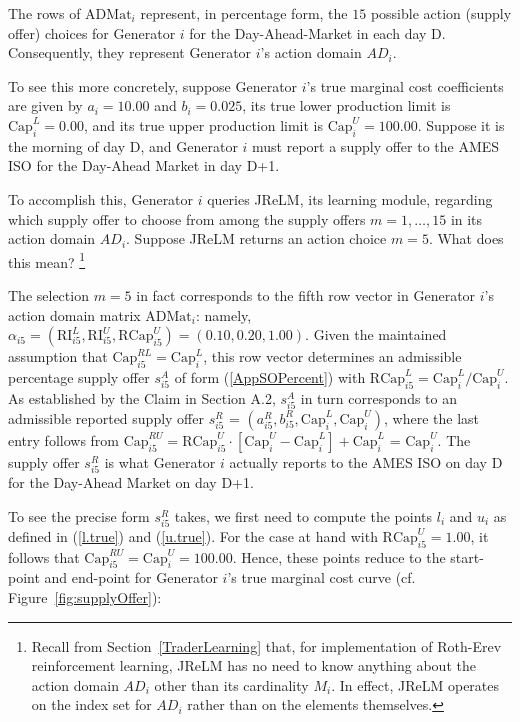 \documentclass[12pt]{article}
\begin{document}
\medskip
\noindent
The rows of $\mbox{ADMat}_i$ represent, in percentage form, the $15$ possible action (supply offer) choices for Generator $i$ for the Day-Ahead-Market in each day D.  Consequently, they represent Generator $i$'s action domain $AD_i$.  

To see this more concretely, suppose Generator $i$'s true marginal cost coefficients are given by $a_i = 10.00$ and $b_i = 0.025$, its true lower production limit is $\mbox{Cap}_i^L = 0.00$, and its true upper production limit is 
$\mbox{Cap}_i^U = 100.00$.  Suppose it is the morning of day D, and Generator $i$ must report a supply offer to the AMES ISO for the Day-Ahead Market in day D+1.  

To accomplish this, Generator $i$ queries JReLM, its learning module, regarding which supply offer to choose from among the supply offers $m = 1,\ldots,15$ in its action domain $AD_i$.  Suppose JReLM returns an action choice $m = 5$.  What does this mean?%
             \footnote{Recall from Section~\ref{TraderLearning} that, for implementation of Roth-Erev 
             reinforcement learning, JReLM has no need to know anything about the action domain $AD_i$ 
             other than its cardinality $M_i$.  In effect, JReLM operates on the index set for 
             $AD_i$ rather than on the elements themselves.} 
  

The selection $m=5$ in fact corresponds to the fifth row vector in Generator $i$'s action domain matrix $\mbox{ADMat}_i$: namely, $\alpha_{i5}= (\mbox{RI}^L_{i5},\mbox{RI}^U_{i5},\mbox{RCap}^{U}_{i5}) = (0.10,0.20,1.00)$.  Given the maintained assumption that $\mbox{Cap}^{RL}_{i5} = \mbox{Cap}^{L}_i$,
this row vector determines an admissible percentage supply offer $s^A_{i5}$ of form (\ref{AppSOPercent}) 
with $\mbox{RCap}^{L}_{i5} = \mbox{Cap}^L_i/\mbox{Cap}^U_i$.  As established by the Claim in Section A.2, $s^A_{i5}$ in turn corresponds to an admissible reported supply offer $s^R_{i5}$ =
$(a^R_{i5}, b^R_{i5}, \mbox{Cap}^{L}_{i}, \mbox{Cap}_{i}^{U})$, where the last entry follows from 
$\mbox{Cap}_{i5}^{RU} = \mbox{RCap}_{i5}^{U} \cdot [\mbox{Cap}_{i}^U -  \mbox{Cap}_{i}^L ] + \mbox{Cap}_{i}^L$ = 
$\mbox{Cap}_{i}^U$.  The supply offer $s^R_{i5}$ is what 
Generator $i$ actually reports to the AMES ISO on day D for the Day-Ahead Market on day D+1.  

To see the precise form $s^R_{i5}$ takes, we first need to compute the points $l_i$ and $u_i$ as defined in 
(\ref{l.true}) and (\ref{u.true}).  For the case at hand 
with $\mbox{RCap}^{U}_{i5} = 1.00$, it follows that $\mbox{Cap}^{RU}_{i5} = \mbox{Cap}^U_i = 100.00.$
Hence, these points reduce to the start-point and end-point for Generator $i$'s true marginal cost curve (cf. Figure~\ref{fig:supplyOffer}):  
\end{document}
